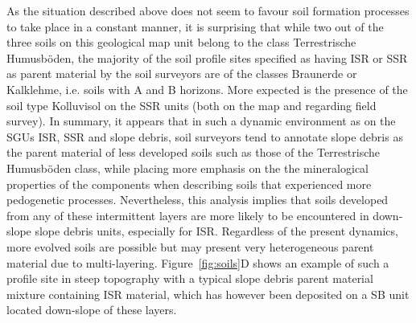 \documentclass[preprint,12pt,authoryear]{elsarticle}
\begin{document}
As the situation described above does not seem to favour soil formation processes to take place in a constant manner, it is surprising that while two out of the three soils on this geological map unit belong to the class Terrestrische Humusb\"oden, the majority of the soil profile sites specified as having ISR or SSR as parent material by the soil surveyors are of the classes Braunerde or Kalklehme, i.e. soils with A and B horizons. More expected is the presence of the soil type Kolluvisol on the SSR units (both on the map and regarding field survey). In summary, it appears that in such a dynamic environment as on the SGUs ISR, SSR and slope debris, soil surveyors tend to annotate slope debris as the parent material of less developed soils such as those of the Terrestrische Humusb\"oden class, while placing more emphasis on the the mineralogical properties of the components when describing soils that experienced more pedogenetic processes. Nevertheless, this analysis implies that soils developed from any of these intermittent layers are more likely to be encountered in down-slope slope debris units, especially for ISR. Regardless of the present dynamics, more evolved soils are possible but may present very heterogeneous parent material due to multi-layering. Figure~\ref{fig:soils}D shows an example of such a profile site in steep topography with a typical slope debris parent material mixture containing ISR material, which has however been deposited on a SB unit located down-slope of these layers.
\end{document}

